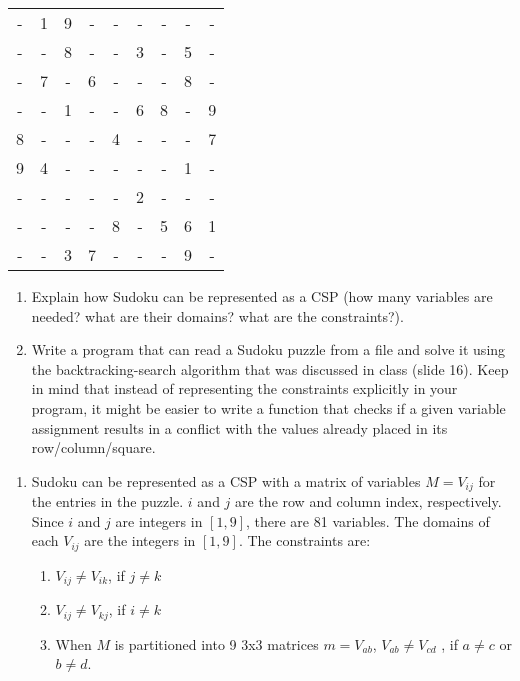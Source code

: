 \documentclass[12pt]{article}
\newenvironment{problem}[2][Problem]{\begin{trivlist}
\item[\hskip \labelsep {\bfseries #1}\hskip \labelsep {\bfseries #2.}]}{\end{trivlist}}
\begin{document}
\begin{problem}{2}
	\begin{tabular}{ccccccccc}
		- & 1 & 9 & - & - & - & - & - & - \\
		- & - & 8 & - & - & 3 & - & 5 & - \\
		- & 7 & - & 6 & - & - & - & 8 & - \\
		- & - & 1 & - & - & 6 & 8 & - & 9 \\
		8 & - & - & - & 4 & - & - & - & 7 \\
		9 & 4 & - & - & - & - & - & 1 & - \\
		- & - & - & - & - & 2 & - & - & - \\
		- & - & - & - & 8 & - & 5 & 6 & 1 \\
		- & - & 3 & 7 & - & - & - & 9 & - \\
	\end{tabular}
	\begin{enumerate}
		\item Explain how Sudoku can be represented as a CSP (how many variables are needed? what are their domains? what are the constraints?). 
		\item Write a program that can read a Sudoku puzzle from a file and solve it using the backtracking-search algorithm that was discussed in class (slide 16).
			Keep in mind that instead of representing the constraints explicitly in your program, it might be easier to write a function that checks if a given variable assignment results in a conflict with the values already placed in its row/column/square.
	\end{enumerate}
	\begin{enumerate}
		\item Sudoku can be represented as a CSP with a matrix of variables $M=V_{ij}$ for the entries in the puzzle.
			$i$ and $j$ are the row and column index, respectively.
			Since $i$ and $j$ are integers in $[1,9]$, there are 81 variables.
			The domains of each $V_{ij}$ are the integers in $[1,9]$.
			The constraints are:
			\begin{enumerate}
				\item $V_{ij} \neq V_{ik}$, if $j \neq k$
				\item $V_{ij} \neq V_{kj}$, if $i \neq k$
				\item When $M$ is partitioned into 9 3x3 matrices $m = V_{ab}$, $V_{ab} \neq V_{cd}$ , if $a \neq c$ or $b \neq d$.
			\end{enumerate}
	\end{enumerate}
\end{problem}
\end{document}
